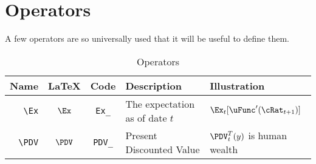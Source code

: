 \documentclass[12pt]{\econtex}
\begin{document}
\hypertarget{Operators}{}
\section{Operators}
A few operators are so universally used that it will be useful to define them.

\begin{table}[ht]
  \centering
  \begin{tabular}{|>{\ttfamily}rccll|} 		
    \hline
    Name    & \LaTeX         & Code & Description & Illustration
    \\ \hline
    \verb|\Ex|        & $\Ex$       & \texttt{Ex\_} & The expectation as of date $t$ & $\Ex_{t}[\uFunc^{\prime}(\cRat_{t+1})]$
    \\   \verb|\PDV|        & $\PDV$       & \texttt{PDV\_} & Present Discounted Value & $\PDV_{t}^{T}(y)$ is human wealth
    \\	\hline
  \end{tabular}
  \caption{Operators}
  \label{table:Operators}
\end{table}	



\hypertarget{Modifiers}{}
\end{document}
